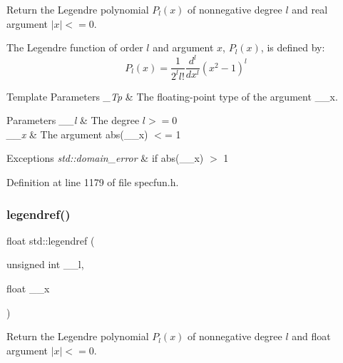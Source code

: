 Return the Legendre polynomial $ P_l(x) $ of nonnegative degree $ l $ and real argument $ |x| <= 0 $.

The Legendre function of order $ l $ and argument $ x $, $ P_l(x) $, is defined by\+: \[ P_l(x) = \frac{1}{2^l l!}\frac{d^l}{dx^l}(x^2 - 1)^{l} \]


\begin{DoxyTemplParams}{Template Parameters}
{\em \+\_\+\+Tp} & The floating-\/point type of the argument {\ttfamily \+\_\+\+\_\+x}. \\
\hline
\end{DoxyTemplParams}

\begin{DoxyParams}{Parameters}
{\em \+\_\+\+\_\+l} & The degree $ l >= 0 $ \\
\hline
{\em \+\_\+\+\_\+x} & The argument {\ttfamily abs(\+\_\+\+\_\+x)} $<$= 1 \\
\hline
\end{DoxyParams}

\begin{DoxyExceptions}{Exceptions}
{\em std\+::domain\+\_\+error} & if {\ttfamily abs(\+\_\+\+\_\+x)} $>$ 1 \\
\hline
\end{DoxyExceptions}


Definition at line 1179 of file specfun.\+h.

\mbox{\label{group__tr29124__math__spec__func_gaed94e3c664c99f5204da75be75aeac21}} 
\subsubsection{\texorpdfstring{legendref()}{legendref()}}
{\footnotesize\ttfamily float std\+::legendref (\begin{DoxyParamCaption}\item[{unsigned int}]{\+\_\+\+\_\+l,  }\item[{float}]{\+\_\+\+\_\+x }\end{DoxyParamCaption})\hspace{0.3cm}{\ttfamily [inline]}}

Return the Legendre polynomial $ P_l(x) $ of nonnegative degree $ l $ and {\ttfamily float} argument $ |x| <= 0 $.

